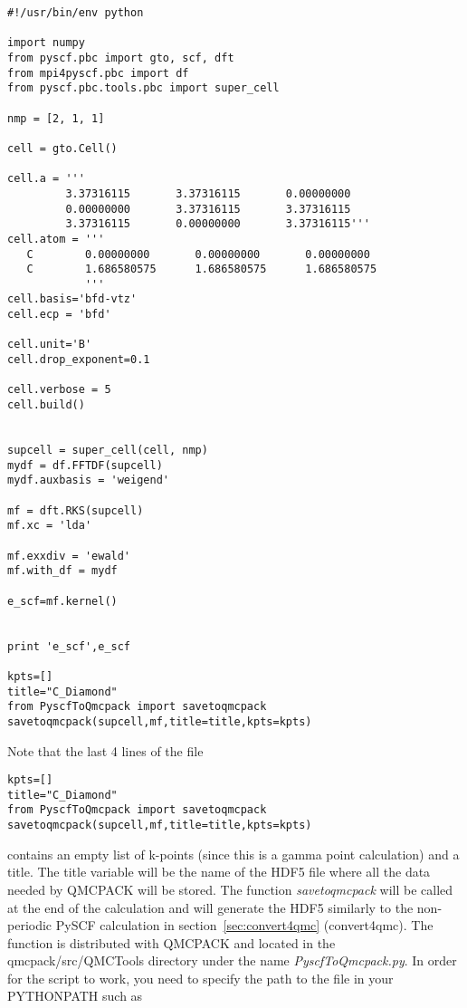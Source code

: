 \begin{lstlisting}[caption=Example PySCF input for single k-point calculation for a 2x1x1 Carbon supercell.]
#!/usr/bin/env python

import numpy
from pyscf.pbc import gto, scf, dft
from mpi4pyscf.pbc import df 
from pyscf.pbc.tools.pbc import super_cell

nmp = [2, 1, 1]

cell = gto.Cell()

cell.a = '''
         3.37316115       3.37316115       0.00000000
         0.00000000       3.37316115       3.37316115
         3.37316115       0.00000000       3.37316115'''
cell.atom = '''  
   C        0.00000000       0.00000000       0.00000000
   C        1.686580575      1.686580575      1.686580575 
            '''
cell.basis='bfd-vtz'
cell.ecp = 'bfd'

cell.unit='B'
cell.drop_exponent=0.1

cell.verbose = 5
cell.build()


supcell = super_cell(cell, nmp)
mydf = df.FFTDF(supcell)
mydf.auxbasis = 'weigend'

mf = dft.RKS(supcell)
mf.xc = 'lda'

mf.exxdiv = 'ewald'
mf.with_df = mydf

e_scf=mf.kernel()


print 'e_scf',e_scf

kpts=[]
title="C_Diamond"
from PyscfToQmcpack import savetoqmcpack
savetoqmcpack(supcell,mf,title=title,kpts=kpts)

\end{lstlisting}

Note that the last 4 lines of the file
\begin{lstlisting}
kpts=[]
title="C_Diamond"
from PyscfToQmcpack import savetoqmcpack
savetoqmcpack(supcell,mf,title=title,kpts=kpts)
\end{lstlisting}

contains an empty list of k-points (since this is a gamma point
calculation) and a title. The title variable will be the name of the
HDF5 file where all the data needed by QMCPACK will be stored.  The
function \textit{savetoqmcpack} will be called at the end of the
calculation and will generate the HDF5 similarly to the non-periodic
PySCF calculation in section~\ref{sec:convert4qmc} (convert4qmc). The
function is distributed with QMCPACK and located in the
qmcpack/src/QMCTools directory under the name
\textit{PyscfToQmcpack.py}. In order for the script to work, you need
to specify the path to the file in your PYTHONPATH such as

